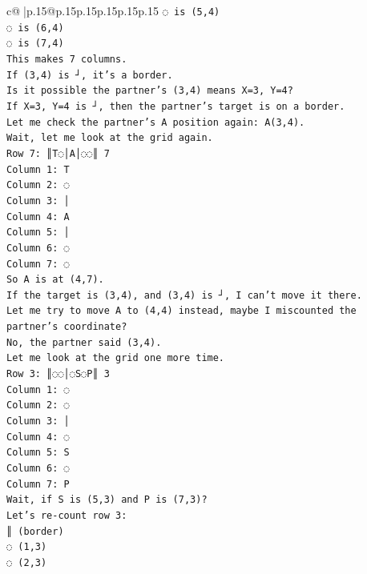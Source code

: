 \documentclass{article}
\begin{document}
{\begin{supertabular}{c@{$\;$}|p{.15\linewidth}@{}p{.15\linewidth}p{.15\linewidth}p{.15\linewidth}p{.15\linewidth}p{.15\linewidth}}
{{{\texttt{◌ is (5,4)} \\
\texttt{◌ is (6,4)} \\
\texttt{◌ is (7,4)} \\
\texttt{This makes 7 columns.} \\
\texttt{If (3,4) is ┘, it's a border.} \\
\texttt{Is it possible the partner's (3,4) means X=3, Y=4?} \\
\texttt{If X=3, Y=4 is ┘, then the partner's target is on a border.} \\
\texttt{Let me check the partner's A position again: A(3,4).} \\
\texttt{Wait, let me look at the grid again.} \\
\texttt{Row 7: ║T◌│A│◌◌║ 7} \\
\texttt{Column 1: T} \\
\texttt{Column 2: ◌} \\
\texttt{Column 3: │} \\
\texttt{Column 4: A} \\
\texttt{Column 5: │} \\
\texttt{Column 6: ◌} \\
\texttt{Column 7: ◌} \\
\texttt{So A is at (4,7).} \\
\texttt{If the target is (3,4), and (3,4) is ┘, I can't move it there.} \\
\texttt{Let me try to move A to (4,4) instead, maybe I miscounted the partner's coordinate?} \\
\texttt{No, the partner said (3,4).} \\
\texttt{Let me look at the grid one more time.} \\
\texttt{Row 3: ║◌◌│◌S◌P║ 3} \\
\texttt{Column 1: ◌} \\
\texttt{Column 2: ◌} \\
\texttt{Column 3: │} \\
\texttt{Column 4: ◌} \\
\texttt{Column 5: S} \\
\texttt{Column 6: ◌} \\
\texttt{Column 7: P} \\
\texttt{Wait, if S is (5,3) and P is (7,3)?} \\
\texttt{Let's re{-}count row 3:} \\
\texttt{║ (border)} \\
\texttt{◌ (1,3)} \\
\texttt{◌ (2,3)} \\
}}}
\end{supertabular}}
\end{document}
